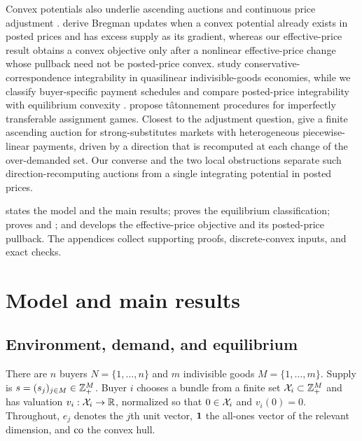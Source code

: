 Convex potentials also underlie ascending auctions and continuous price adjustment \citep{gulstacchetti2000,ausubel2006,milgromstrulovici2009,murotaetal2016,paesleme2017}. \citet{cheungcoledevanur2020} derive Bregman updates when a convex potential already exists in posted prices and has excess supply as its gradient, whereas our effective-price result obtains a convex objective only after a nonlinear effective-price change whose pullback need not be posted-price convex. \citet{bedardgoeree2025} study conservative-correspondence integrability in quasilinear indivisible-goods economies, while we classify buyer-specific payment schedules and compare posted-price integrability with equilibrium convexity \citep[see also][]{rockafellar1966,rochet1987,kushnirlokutsievskiy2021}. \citet{balkanskienfaenza2024} propose t\^atonnement procedures for imperfectly transferable assignment games. Closest to the adjustment question, \citet{okisato2026} give a finite ascending auction for strong-substitutes markets with heterogeneous piecewise-linear payments, driven by a direction that is recomputed at each change of the over-demanded set. Our converse and the two local obstructions separate such direction-recomputing auctions from a single integrating potential in posted prices.

 states the model and the main results;  proves the equilibrium classification;  proves  and ; and  develops the effective-price objective and its posted-price pullback. The appendices collect supporting proofs, discrete-convex inputs, and exact checks.

\section{Model and main results}\label{sec:model}

\subsection{Environment, demand, and equilibrium}\label{subsec:environment}

There are $n$ buyers $N=\{1,\ldots,n\}$ and $m$ indivisible goods $M=\{1,\ldots,m\}$. Supply is $s=(s_j)_{j\in M}\in\mathbb{Z}_+^M$. Buyer $i$ chooses a bundle from a finite set $\mathcal{X}_i\subset\mathbb{Z}_+^M$ and has valuation $v_i:\mathcal{X}_i\to\mathbb{R}$, normalized so that $0\in\mathcal{X}_i$ and $v_i(0)=0$. Throughout, $e_j$ denotes the $j$th unit vector, $\mathbf{1}$ the all-ones vector of the relevant dimension, and $\operatorname{co}$ the convex hull.

